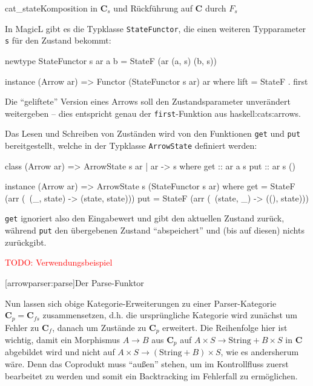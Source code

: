 \documentclass[12pt, a4paper, bibgerm]{scrbook}
\newenvironment{DIFnomarkup}{}{}
\newcommand\icode[1]{\lstinline?#1?}
\newcommand{\todo}[1]{
  \textcolor{red}{TODO: #1}
}
\newcommand\lsection{}
\newcommand\sref{}
\newcommand\fig{}
\newcommand\ato{\rightarrow} %
\begin{document}
\fig{cat_state}{Komposition in $\mathbf{C}_s$ und Rückführung auf
  $\mathbf{C}$ durch $F_s$}

In MagicL gibt es die Typklasse \icode{StateFunctor}, die einen weiteren
Typparameter \icode{s} für den Zustand bekommt:

\begin{DIFnomarkup}\begin{code}
newtype StateFunctor s ar a b = StateF (ar (a, s) (b, s))

instance (Arrow ar) => Functor (StateFunctor s ar) ar where
    lift = StateF . first
\end{code}\end{DIFnomarkup} %

Die "`geliftete"' Version eines Arrows soll den Zustandsparameter
unverändert weitergeben -- dies entspricht genau der
\icode{first}-Funktion aus \sref{haskell:cats:arrows}.

Das Lesen und Schreiben von Zuständen wird von den Funktionen \icode{get} und
\icode{put} bereitgestellt, welche in der Typklasse \icode{ArrowState}
definiert werden:

\begin{DIFnomarkup}\begin{code}
class (Arrow ar) => ArrowState s ar | ar -> s where
  get :: ar a s
  put :: ar s ()

instance (Arrow ar) => ArrowState s (StateFunctor s ar)
  where
    get = StateF (arr (\ (_, state) -> (state, state)))
    put = StateF (arr (\ (state, _) -> ((), state)))
\end{code}\end{DIFnomarkup}

\icode{get} ignoriert also den Eingabewert und gibt den aktuellen
Zustand zurück, während \icode{put} den übergebenen Zustand
"`abspeichert"' und (bis auf diesen) nichts zurückgibt.

\todo{Verwendungsbeispiel}

\lsection[arrowparser:parse]{Der Parse-Funktor}

Nun lassen sich obige Kategorie-Erweiterungen zu einer Parser-Kategorie
$\mathbf{C}_p = \mathbf{C}_{fs}$ zusammensetzen, d.h. die ursprüngliche
Kategorie wird zunächst um Fehler zu $\mathbf{C}_f$, danach um Zustände
zu $\mathbf{C}_p$ erweitert. Die Reihenfolge hier ist wichtig, damit ein
Morphismus $A \ato B$ aus $\mathbf{C}_p$ auf $A \times S \ato
\mathrm{String} + B \times S$ in $\mathbf{C}$ abgebildet wird und nicht
auf $A \times S \ato (\mathrm{String} + B) \times S$, wie es andersherum
wäre. Denn das Coprodukt muss "`außen"' stehen, um im Kontrollfluss
zuerst bearbeitet zu werden und somit ein Backtracking im Fehlerfall zu
ermöglichen.
\end{document}
